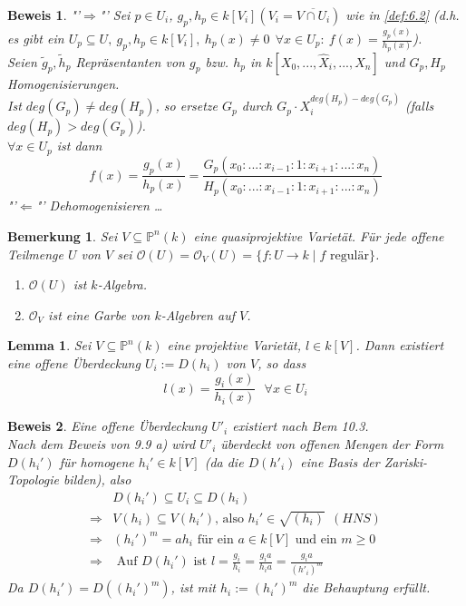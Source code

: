 \documentclass[a4paper,12pt]{report}
\theoremstyle{break}
\newtheorem{Bem}[Def]{Bemerkung}
\newtheorem{Lemma}{Lemma}
\theoremstyle{nonumberbreak}
\theoremstyle{nonumberplain}
\newtheorem{Bew}{Beweis}
\begin{document}
\begin{Bew} "'$\Rightarrow$"' Sei $p\in U_i$, $g_p,h_p\in k[V_i](V_i=\overline{V\cap U_i})$ wie in \ref{def:6.2} (d.h. es gibt ein $U_p\subseteq U,~g_p,h_p\in k[V_i],~h_p(x)\neq 0 ~~\forall x\in U_p: ~f(x)=\frac{g_p(x)}{h_p(x)}$).\\
Seien $\tilde{g}_p, \tilde{h}_p$ Repräsentanten von $g_p$ bzw. $h_p$ in $k[X_0,...,\hat{X}_i,...,X_n]$ und $G_p, H_p$ Homogenisierungen.\\
Ist $deg(G_p)\neq deg(H_p)$, so ersetze $G_p$ durch $G_p\cdot X_i^{deg(H_p)-deg(G_p)}$ (falls $deg(H_p)>deg(G_p)$).\\
$\forall x\in U_p$ ist dann $$f(x)=\frac{g_p(x)}{h_p(x)}=\frac{G_p(x_0:...:x_{i-1}:1:x_{i+1}:...:x_n)}{H_p(x_0:...:x_{i-1}:1:x_{i+1}:...:x_n)}$$
"'$\Leftarrow$"' Dehomogenisieren \dots
\end{Bew}
\begin{Bem}
Sei $V\subseteq\mathbb{P}^n(k)$ eine quasiprojektive Varietät. Für jede offene Teilmenge $U$ von $V$ sei $\mathcal{O}(U)=\mathcal{O}_V(U)=\{f: U\rightarrow k \mid f \text{ regulär} \}$.
\begin{enumerate}
\item $\mathcal{O}(U)$ ist $k$-Algebra.
\item $\mathcal{O}_V$ ist eine Garbe von $k$-Algebren auf $V$.
\end{enumerate}
\end{Bem}

\begin{Lemma}
\label{}
Sei $V\subseteq\mathbb{P}^n(k)$ eine projektive Varietät, $l\in k[V]$. Dann existiert eine offene Überdeckung $U_i:=D(h_i)$ von $V$, so dass
$$l(x)=\frac{g_i(x)}{h_i(x)}~~~\forall x\in U_i$$
\end{Lemma}

\begin{Bew}
Eine offene Überdeckung $U'_i$ existiert nach Bem 10.3.\\
Nach dem Beweis von 9.9 a) wird $U'_i$ überdeckt von offenen Mengen der Form $D(h_i')$ für homogene $h_i'\in k[V]$ (da die $D(h'_i)$ eine Basis der Zariski-Topologie bilden), also
\begin{align*}
&D(h_i')\subseteq U_i\subseteq D(h_i)\\
\Rightarrow & V(h_i)\subseteq V(h_i')  \text{, also } h_i'\in\sqrt{(h_i)} ~~ (HNS)\\
\Rightarrow & (h_i')^m=ah_i  \text{ für ein } a\in k[V] \text{ und ein } m\geq 0\\
\Rightarrow & \text{ Auf } D(h_i') \text{ ist } l=\frac{g_i}{h_i}=\frac{g_ia}{h_ia}=\frac{g_ia}{(h'_i)^m}
\end{align*}
Da $D(h_i')=D((h_i')^m)$, ist mit $h_i:=(h_i')^m$ die Behauptung erfüllt.
\end{Bew}
\end{document}
